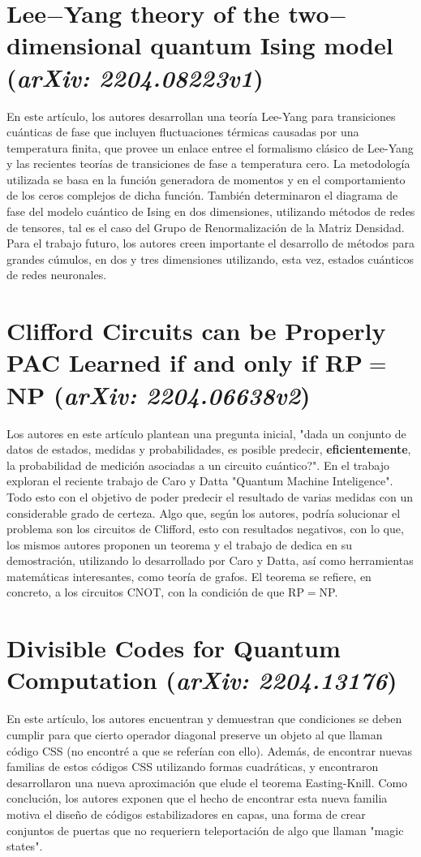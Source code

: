 \section{Lee$-$Yang theory of the two$-$dimensional quantum Ising model (\textit{arXiv: 2204.08223v1})}
\justify
En este artículo, los autores desarrollan una teoría Lee-Yang para transiciones cuánticas de fase que incluyen fluctuaciones térmicas causadas por una temperatura finita, que provee un enlace entree el formalismo clásico de Lee-Yang y las recientes teorías de transiciones de fase a temperatura cero. La metodología utilizada se basa en la función generadora de momentos y en el comportamiento de los ceros complejos de dicha función. También determinaron el diagrama de fase del modelo cuántico de Ising en dos dimensiones, utilizando métodos de redes de tensores, tal es el caso del Grupo de Renormalización de la Matriz Densidad. Para el trabajo futuro, los autores creen importante el desarrollo de métodos para grandes cúmulos, en dos y tres dimensiones utilizando, esta vez, estados cuánticos de redes neuronales.

\section{Clifford Circuits can be Properly PAC Learned if and only if \textbf{RP}$=$\textbf{NP} (\textit{arXiv: 2204.06638v2})}
\justify
Los autores en este artículo plantean una pregunta inicial, "dada un conjunto de datos de estados, medidas y probabilidades, es posible predecir, \textbf{eficientemente}, la probabilidad de medición asociadas a un circuito cuántico?". En el trabajo exploran el reciente trabajo de Caro y Datta "Quantum Machine Inteligence". Todo esto con el objetivo de poder predecir el resultado de varias medidas con un considerable grado de certeza. Algo que, según los autores, podría solucionar el problema son los circuitos de Clifford, esto con resultados negativos, con lo que, los mismos autores proponen un teorema y el trabajo de dedica en su demostración, utilizando lo desarrollado por Caro y Datta, así como herramientas matemáticas interesantes, como teoría de grafos. El teorema se refiere, en concreto, a los circuitos CNOT, con la condición de que RP$=$NP.

\section{Divisible Codes for Quantum Computation (\textit{arXiv: 2204.13176})}
\justify
En este artículo, los autores encuentran y demuestran que condiciones se deben cumplir para que cierto operador diagonal preserve un objeto al que llaman código CSS (no encontré a que se referían con ello). Además, de encontrar nuevas familias de estos códigos CSS utilizando formas cuadráticas, y encontraron desarrollaron una nueva aproximación que elude el teorema Easting-Knill. Como conclución, los autores exponen que el hecho de encontrar esta nueva familia motiva el diseño de códigos estabilizadores en capas, una forma de crear conjuntos de puertas que no requeriern teleportación de algo que llaman "magic states".


